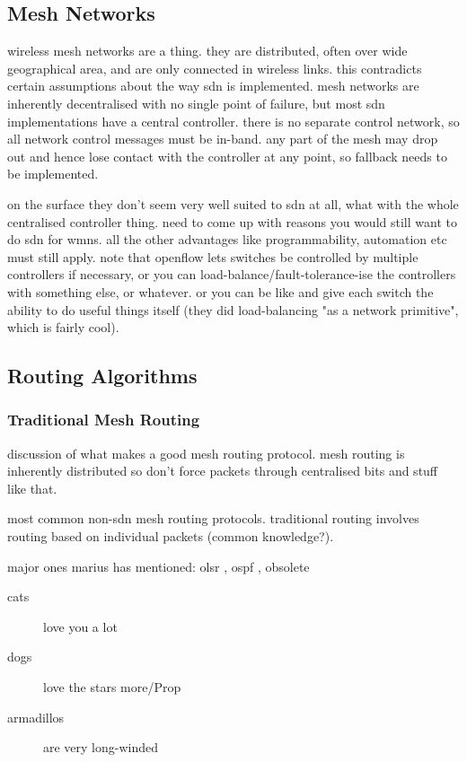 \documentclass[pdftex,12pt,a4paper]{article}
\begin{document}
\subsection{Mesh Networks}
wireless mesh networks are a thing. they are distributed, often over wide geographical area, and are only connected in wireless links. this contradicts certain assumptions about the way sdn is implemented. mesh networks are inherently decentralised with no single point of failure, but most sdn implementations have a central controller. there is no separate control network, so all network control messages must be in-band. any part of the mesh may drop out and hence lose contact with the controller at any point, so fallback needs to be implemented.

on the surface they don't seem very well suited to sdn at all, what with the whole centralised controller thing. need to come up with reasons you would still want to do sdn for wmns. all the other advantages like programmability, automation etc must still apply. note that openflow lets switches be controlled by multiple controllers if necessary, or you can load-balance/fault-tolerance-ise the controllers with something else, or whatever. or you can be like \cite{handigol:asterix} and give each switch the ability to do useful things itself (they did load-balancing "as a network primitive", which is fairly cool).

\subsection{Routing Algorithms}
\subsubsection{Traditional Mesh Routing}
discussion of what makes a good mesh routing protocol. mesh routing is inherently distributed so don't force packets through centralised bits and stuff like that.

most common non-sdn mesh routing protocols. traditional routing involves routing based on individual packets (common knowledge?).

major ones marius has mentioned: olsr \cite{rfc3626}, ospf \cite{rfc5340}, obsolete \cite{rfc4813}

\begin{description}
\item[cats] love you a lot
\item[dogs] love the stars more/Prop
\item[armadillos] are very long-winded
\end{description}
\end{document}
